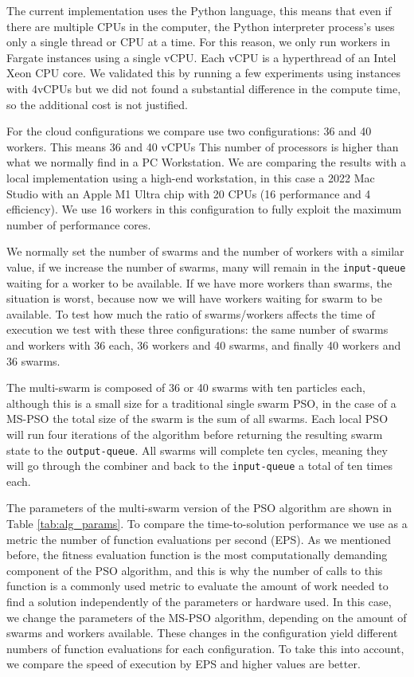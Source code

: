 \documentclass{cys}
\begin{document}
The current implementation uses the Python language, this means that even if there are 
multiple CPUs in the computer, the Python interpreter process's uses only a 
single thread or CPU at a time. For this reason, we only run workers in 
Fargate instances using a single vCPU. Each vCPU is a hyperthread of an 
Intel Xeon CPU core. We validated this by running a few experiments using 
instances with 4vCPUs but we did not found a substantial difference in the 
compute time, so the additional cost is not justified.

For the cloud configurations we compare use two configurations: 36 and 40 workers. 
This means 36 and 40 vCPUs This number of processors is higher than what we normally
find in a PC Workstation. We are comparing the results with a local implementation 
using a high-end workstation, in this case a 2022 Mac Studio with 
an Apple M1 Ultra chip with 20 CPUs (16 performance and 4 efficiency). We use 16 
workers in this configuration to fully exploit the maximum number of performance cores.

We normally set the number of swarms and the number of workers with a similar value,
if we increase the number of swarms, many will remain in the \texttt{input-queue} waiting 
for a worker to be available. If we have more workers than swarms, the situation is 
worst, because now we will have workers waiting for swarm to be available. 
To test how much the ratio of swarms/workers affects the time of execution we test 
with these three configurations: the same number of swarms and workers with
36 each, 36 workers and 40 swarms, and finally 40 workers and 36 swarms.
 
The multi-swarm is composed of 36 or 40 swarms with ten
particles each, although this is a small size for a traditional 
single swarm PSO, in the case of a MS-PSO the total size of the 
swarm is the sum of all swarms. Each local PSO will run four iterations of the algorithm
before returning the resulting swarm state to the \texttt{output-queue}. All swarms will
complete ten cycles, meaning they will go through the combiner and back to the
\texttt{input-queue} a total of ten times each. 

The parameters of the multi-swarm version of the PSO algorithm are shown in Table 
\ref{tab:alg_params}.
To compare the time-to-solution performance we use as a metric the number of 
function evaluations per second (EPS). As we mentioned before, the fitness 
evaluation function is the most computationally demanding component of the PSO 
algorithm, and this is why the number of calls to this function is a commonly 
used metric to evaluate the amount of work needed to 
find a solution independently of the parameters or hardware used. In this case, 
we change the parameters of the MS-PSO algorithm, depending on the amount 
of swarms and workers available. These changes in the configuration yield 
different numbers of function evaluations for each configuration. To take
this into account, we compare the speed of execution by EPS and higher 
values are better.
\end{document}
